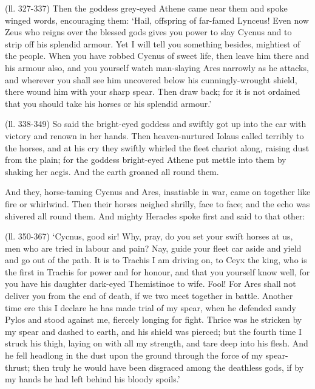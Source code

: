(ll. 327-337) Then the goddess grey-eyed Athene came near them and spoke winged
words, encouraging them: ‘Hail, offspring of far-famed Lynceus! Even now
Zeus who reigns over the blessed gods gives you power to slay Cycnus and to
strip off his splendid armour. Yet I will tell you something besides, mightiest
of the people. When you have robbed Cycnus of sweet life, then leave him there
and his armour also, and you yourself watch man-slaying Ares narrowly as he
attacks, and wherever you shall see him uncovered below his cunningly-wrought
shield, there wound him with your sharp spear. Then draw back; for it is not
ordained that you should take his horses or his splendid armour.’

(ll. 338-349) So said the bright-eyed goddess and swiftly got up into the car
with victory and renown in her hands. Then heaven-nurtured Iolaus called
terribly to the horses, and at his cry they swiftly whirled the fleet chariot
along, raising dust from the plain; for the goddess bright-eyed Athene put
mettle into them by shaking her aegis. And the earth groaned all round them.

And they, horse-taming Cycnus and Ares, insatiable in war, came on together
like fire or whirlwind. Then their horses neighed shrilly, face to face; and
the echo was shivered all round them. And mighty Heracles spoke first and said
to that other:

(ll. 350-367) ‘Cycnus, good sir! Why, pray, do you set your swift horses
at us, men who are tried in labour and pain? Nay, guide your fleet car aside
and yield and go out of the path. It is to Trachis I am driving on, to Ceyx the
king, who is the first in Trachis for power and for honour, and that you
yourself know well, for you have his daughter dark-eyed Themistinoe to wife.
Fool! For Ares shall not deliver you from the end of death, if we two meet
together in battle. Another time ere this I declare he has made trial of my
spear, when he defended sandy Pylos and stood against me, fiercely longing for
fight. Thrice was he stricken by my spear and dashed to earth, and his shield
was pierced; but the fourth time I struck his thigh, laying on with all my
strength, and tare deep into his flesh. And he fell headlong in the dust upon
the ground through the force of my spear-thrust; then truly he would have been
disgraced among the deathless gods, if by my hands he had left behind his
bloody spoils.’

